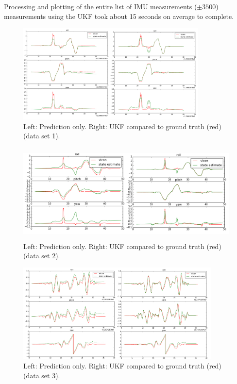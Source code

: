 \documentclass[letterpaper, 10 pt, conference]{ieeeconf}  %
\begin{document}
Processing and plotting of the entire list of IMU measurements ($\pm 3500$) measurements using the UKF took about 15 seconds on average to complete.

   
\begin{figure} [ht]
  \includegraphics[width=\textwidth,height=5cm]{compare1}
  \caption{Left: Prediction only. Right: UKF compared to ground truth (red) (data set 1).}
  \label{compare1}
\end{figure}   
 
\begin{figure} [ht]
  \includegraphics[width=\textwidth,height=5cm]{compare2}
  \caption{Left: Prediction only. Right: UKF compared to ground truth (red) (data set 2).}
  \label{compare2}
\end{figure} 

\begin{figure}
  \includegraphics[width=\textwidth,height=5cm]{compare3}
  \caption{Left: Prediction only. Right: UKF compared to ground truth (red) (data set 3).}
  \label{compare3}
\end{figure} 
\end{document}
